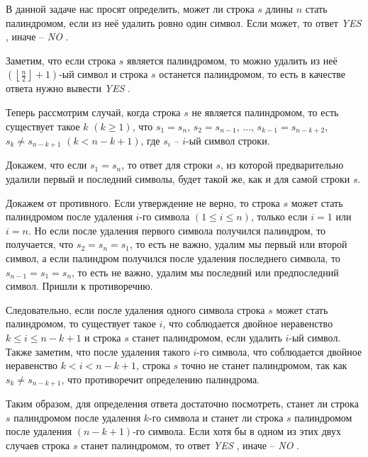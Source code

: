 \solutionSection

В данной задаче нас просят определить, может ли строка $s$ длины $n$ стать палиндромом, если из неё удалить ровно один символ. Если может, то ответ \textit{YES} , иначе -- \textit{NO} .

Заметим, что если строка $s$ является палиндромом, то можно удалить из неё $\left( \left \lfloor \frac{n}{2} \right \rfloor + 1  \right)$-ый символ и строка $s$ останется палиндромом, то есть в качестве ответа нужно вывести \textit{YES} .

Теперь рассмотрим случай, когда строка $s$ не является палиндромом, то есть существует такое $k$ $(k \ge 1)$, что $s_1 = s_n$, $s_2 = s_{n - 1}$, $...$, $s_{k - 1} = s_{n - k + 2}$, $s_k \neq s_{n - k + 1}$ $(k < n - k + 1)$, где $s_i$ -- $i$-ый символ строки.

Докажем, что если $s_1 = s_n$, то ответ для строки $s$, из которой предварительно удалили первый и последний символы, будет такой же, как и для самой строки $s$.

Докажем от противного. Если утверждение не верно, то строка $s$ может стать палиндромом после удаления $i$-го символа $(1 \le i \le n)$, только если $i = 1$ или $i = n$. Но если после удаления первого символа получился палиндром, то получается, что $s_2 = s_n = s_1$, то есть не важно, удалим мы первый или второй символ, а если палиндром получился после удаления последнего символа, то $s_{n - 1} = s_1 = s_n$, то есть не важно, удалим мы последний или предпоследний символ. Пришли к противоречию.

Следовательно, если после удаления одного символа строка $s$ может стать палиндромом, то существует такое $i$, что соблюдается двойное неравенство $k \le i \le n - k + 1$ и строка $s$ станет палиндромом, если удалить $i$-ый символ. Также заметим, что после удаления такого $i$-го символа, что соблюдается двойное неравенство $k < i < n - k + 1$, строка $s$ точно не станет палиндромом, так как $s_k \neq s_{n - k + 1}$, что противоречит определению палиндрома.

Таким образом, для определения ответа достаточно посмотреть, станет ли строка $s$ палиндромом после удаления $k$-го символа и станет ли строка $s$ палиндромом после удаления $(n - k + 1)$-го символа. Если хотя бы в одном из этих двух случаев строка $s$ станет палиндромом, то ответ \textit{YES} , иначе -- \textit{NO} .

\codeExample

